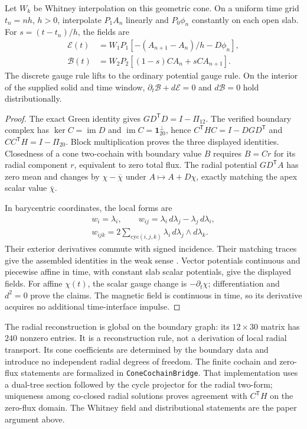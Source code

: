 \begin{theorem}
Let \(W_k\) be Whitney interpolation on this geometric cone. On a uniform
time grid \(t_n=nh\), \(h>0\), interpolate \(P_1A_n\) linearly and
\(P_0\phi_n\) constantly on each open slab. For \(s=(t-t_n)/h\), the fields are
\begin{align*}
 \mathcal E(t)&=W_1P_1\left[-(A_{n+1}-A_n)/h-D\phi_n\right],\\
 \mathcal B(t)&=W_2P_2\left[(1-s)CA_n+sCA_{n+1}\right].
\end{align*}
The discrete gauge rule lifts to the ordinary potential gauge rule.
On the interior of the supplied solid and time window,
\(\partial_t\mathcal B+d\mathcal E=0\) and \(d\mathcal B=0\)
hold distributionally.
\end{theorem}

\begin{proof}
The exact Green identity gives
\(GD^{\mathsf T}D=I-\Pi_{12}\). The verified boundary complex has
\(\ker C=\operatorname{im}D\) and
\(\operatorname{im}C=\mathbf1_{20}^{\perp}\), hence
\(C^{\mathsf T}HC=I-DGD^{\mathsf T}\) and \(CC^{\mathsf T}H=I-\Pi_{20}\).
Block multiplication proves the three displayed identities.
Closedness of a cone two-cochain with boundary value \(B\) requires
\(B=Cr\) for its radial component \(r\), equivalent to zero total flux.
The radial potential \(GD^{\mathsf T}A\) has zero mean and changes by
\(\chi-\overline\chi\) under \(A\mapsto A+D\chi\), exactly matching
the apex scalar value \(\overline\chi\).

In barycentric coordinates, the local forms are
\begin{gather*}
 w_i=\lambda_i,\qquad
 w_{ij}=\lambda_i\,d\lambda_j-\lambda_j\,d\lambda_i,\\
 w_{ijk}=2\sum_{\mathrm{cyc}(i,j,k)}
                  \lambda_i\,d\lambda_j\wedge d\lambda_k.
\end{gather*}
Their exterior derivatives commute with signed incidence. Their matching
traces give the assembled identities in the weak sense
\cite{ArnoldFalkWinther2010}. Vector potentials continuous and piecewise
affine in time, with constant slab scalar potentials, give the displayed fields.
For affine \(\chi(t)\), the scalar gauge change is
\(-\partial_t\chi\); differentiation and \(d^2=0\) prove the claims.
The magnetic field is continuous in time, so its derivative acquires no
additional time-interface impulse.
\end{proof}

The radial reconstruction is global on the boundary graph: its
\(12\times30\) matrix has \(240\) nonzero entries. It is a reconstruction
rule, not a derivation of local radial transport. Its cone coefficients are
determined by the boundary data and introduce no independent radial degrees
of freedom. The finite cochain and zero-flux statements are formalized in
\texttt{ConeCochainBridge}. That implementation uses a
dual-tree section followed by the cycle projector for the radial two-form;
uniqueness among co-closed radial solutions proves agreement with
\(C^{\mathsf T}H\) on the zero-flux domain. The Whitney field and
distributional statements are the paper argument above.

